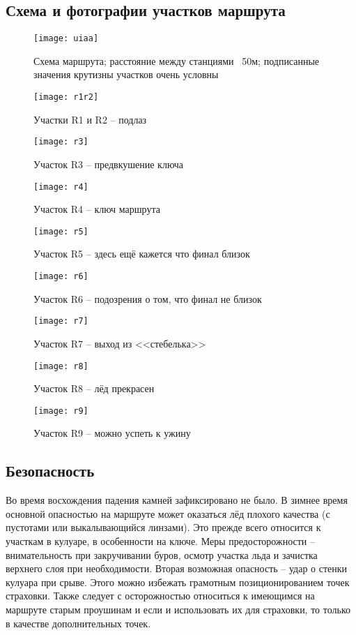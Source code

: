 \documentclass[fleqn, 10pt]{extarticle}
\begin{document}
\subsection{Схема и фотографии участков маршрута}
	\begin{figure}[ht]
		\centering
		\texttt{[image: uiaa]}
		\caption{Схема маршрута; расстояние между станциями ~50м; подписанные значения крутизны участков очень условны}\label{uiaa}
	\end{figure}
	\begin{figure}[ht]
		\centering
		\texttt{[image: r1r2]}
		\caption{Участки R1 и R2 -- подлаз}\label{r1r2}
	\end{figure}
	\begin{figure}[ht]
		\centering
		\texttt{[image: r3]}
		\caption{Участок R3 -- предвкушение ключа}\label{r3}
	\end{figure}
	\begin{figure}[ht]
		\centering
		\texttt{[image: r4]}
		\caption{Участок R4 -- ключ маршрута}\label{r4}
	\end{figure}
	\begin{figure}[ht]
		\centering
		\texttt{[image: r5]}
		\caption{Участок R5 -- здесь ещё кажется что финал близок}\label{r5}
	\end{figure}
	\begin{figure}[ht]
		\centering
		\texttt{[image: r6]}
		\caption{Участок R6 -- подозрения о том, что финал не близок}\label{r6}
	\end{figure}
	\begin{figure}[ht]
		\centering
		\texttt{[image: r7]}
		\caption{Участок R7 -- выход из <<стебелька>>}\label{r1r2}
	\end{figure}
	\begin{figure}[ht]
		\centering
		\texttt{[image: r8]}
		\caption{Участок R8 -- лёд прекрасен}\label{r8}
	\end{figure}
	\begin{figure}[ht]
		\centering
		\texttt{[image: r9]}
		\caption{Участок R9 -- можно успеть к ужину}\label{r9}
	\end{figure}
	\FloatBarrier

\subsection{Безопасность}
	Во время восхождения падения камней зафиксировано не было. В зимнее время основной опасностью на маршруте может оказаться лёд плохого качества (с пустотами или выкалывающийся линзами).
	Это прежде всего относится к участкам в кулуаре, в особенности на ключе. Меры предосторожности -- внимательность при закручивании буров, осмотр участка льда
	и зачистка верхнего слоя при необходимости. Вторая возможная опасность -- удар о стенки кулуара при срыве. Этого можно избежать грамотным позиционированием точек страховки.
	Также следует с осторожностью относиться к имеющимся на маршруте старым проушинам и если и использовать их для страховки, то только в качестве дополнительных точек.
\end{document}
